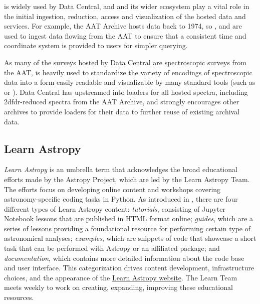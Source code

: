\documentclass[modern]{aastex631}
\newcommand{\secauthor}[1]{{\color{blue}Author:~\textit{#1}}}
\newcommand{\secunfilled}{{\color{red}Author:~\textit{Looking for volunteers!}}}
\begin{document}
\python is widely used by Data Central, and \astropy and its wider ecosystem
play a vital role in the initial ingestion, reduction, access and visualization
of the hosted data and services. For example, the AAT Archive hosts data back to
1974, so \astropycoordinates, \astropytime and \astropyfits are used to ingest
data flowing from the AAT to ensure that a consistent time and coordinate system
is provided to users for simpler querying.

As many of the surveys hosted by Data Central are spectroscopic surveys from the
AAT,  is heavily used to standardize the variety of encodings
of spectroscopic data into a form easily readable and visualizable by many
standard tools (such as  or ). Data Central has
upstreamed into  loaders for all hosted spectra, including
2dfdr-reduced spectra from the AAT Archive, and strongly encourages other
archives to provide loaders for their data to further reuse of existing archival
data.



\subsection{Learn Astropy} \label{sec:learn}



\textit{Learn Astropy} is an umbrella term that acknowledges the broad
educational efforts made by the Astropy Project, which are led by the Learn
Astropy Team.
The efforts focus on developing online content and workshops covering
astronomy-specific coding tasks in Python.
As introduced in \citet{astropy:2018}, there are four different types of
Learn Astropy content: \textit{tutorials}, consisting of Jupyter Notebook
lessons that are published in HTML format online; \textit{guides}, which are a
series of lessons providing a foundational resource for performing certain
type of astronomical analyses; \textit{examples}, which are snippets of code
that showcase a short task that can be performed with Astropy or an affiliated
package; and \textit{documentation}, which contains more detailed information
about the code base and user interface.
This categorization drives content development, infrastructure choices, and the
appearance of the \href{https://learn.astropy.org}{Learn Astropy website}.
The Learn Team meets weekly to work on creating, expanding, improving these
educational resources.
\end{document}
